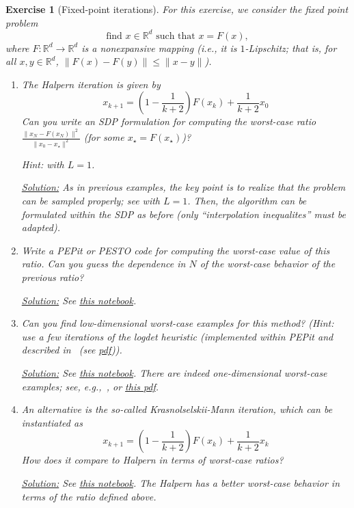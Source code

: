 \documentclass[11pt,a4paper]{article}
\newcommand{\pesto}{{PESTO }}
\newcommand{\pepit}{{PEPit }}
\newcommand{\correction}[1]{{{\color{blue}\underline{Solution:} #1}}}
\newcommand{\correction}[1]{}
\newtheorem{exercise}{Exercise}
\begin{document}
	
	\begin{exercise}[Fixed-point iterations]\label{ex:halpern}
For this exercise, we consider the fixed point problem
	\[ \text{find } x\in\mathbb{R}^d \text{ such that } x=F(x), \]
	where $F:\mathbb{R}^d\rightarrow \mathbb{R}^d$ is a nonexpansive mapping (i.e., it is $1$-Lipschitz; that is, for all $x,y\in\mathbb{R}^d$, $\|F(x)-F(y)\|\leqslant \|x-y\|$).
	\begin{enumerate}
	\item The Halpern iteration is given by
	\[ x_{k+1} = \left(1-\frac{1}{k+2}\right)F(x_k) + \frac{1}{k+2} x_0\]
	Can you write an SDP formulation for computing the worst-case ratio $\frac{\|x_{N}-F(x_N)\|^2}{\|x_0-x_\star\|^2}$ (for some $x_\star=F(x_\star)$)?
	
	Hint:  with $L=1$.
	
	\correction{As in previous examples, the key point is to realize that the problem can be sampled properly; see \Cref{thm:Lipschitz_interpolation} with $L=1$. Then, the algorithm can be formulated within the SDP as before (only ``interpolation inequalites'' must be adapted).}
	
	\item Write a \pepit or \pesto code for computing the worst-case value of this ratio. Can you guess the dependence in $N$ of the worst-case behavior of the previous ratio?
	
	\correction{See \href{https://github.com/PerformanceEstimation/Learning-Performance-Estimation/tree/main/Codes/Jupyter/Exercise07.ipynb}{this notebook}.}
	
	\item Can you find low-dimensional worst-case examples for this method? (Hint: use a few iterations of the logdet heuristic (implemented within \pepit and described in~\cite{fazel2003log} (see \href{https://web.stanford.edu/~boyd/papers/pdf/rank_min_heur_hankel.pdf}{pdf})).
	
	\correction{See \href{https://github.com/PerformanceEstimation/Learning-Performance-Estimation/tree/main/Codes/Jupyter/Exercise07.ipynb}{this notebook}.  There are indeed one-dimensional worst-case examples; see, e.g.,~\cite[Example 3.1]{lieder2017convergence}, or \href{http://www.optimization-online.org/DB_FILE/2017/11/6336.pdf}{this pdf}.}
	
	\item An alternative is the so-called Krasnolselskii-Mann iteration, which can be instantiated as
	\[ x_{k+1} = \left(1-\frac{1}{k+2}\right)F(x_k) + \frac{1}{k+2} x_k\]
	How does it compare to Halpern in terms of worst-case ratios?
	
	\correction{See \href{https://github.com/PerformanceEstimation/Learning-Performance-Estimation/tree/main/Codes/Jupyter/Exercise07.ipynb}{this notebook}.  The Halpern has a better worst-case behavior in terms of the ratio defined above.}
	\end{enumerate}
	\end{exercise}
	
\end{document}
